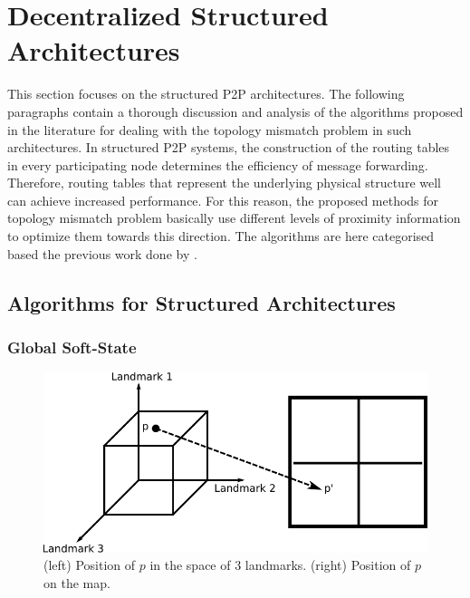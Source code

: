 \section{Decentralized Structured Architectures}
\label{section:structured}

This section focuses on the structured P2P architectures. The following
paragraphs contain a thorough discussion and analysis of the algorithms proposed
in the literature for dealing with the topology mismatch problem in such
architectures. In structured P2P systems, the construction of the routing tables
in every participating node determines the efficiency of message forwarding.
Therefore, routing tables that represent the underlying physical structure well
can achieve increased performance. For this reason, the proposed methods for
topology mismatch problem basically use different levels of proximity
information to optimize them towards this direction. The algorithms are here
categorised based the previous work done by \cite{CDHR2002,CDCR2002,RSS2002}.

\subsection{Algorithms for Structured Architectures}


\subsubsection{Global Soft-State}

\begin{figure}
\centering
  \includegraphics[scale=0.8]{img/algorithms/global_softstate}
\caption{(left) Position of $p$ in the space of $3$ landmarks. (right) Position
of $p$ on the map.}
\label{fig:global_softstate}
\end{figure}

